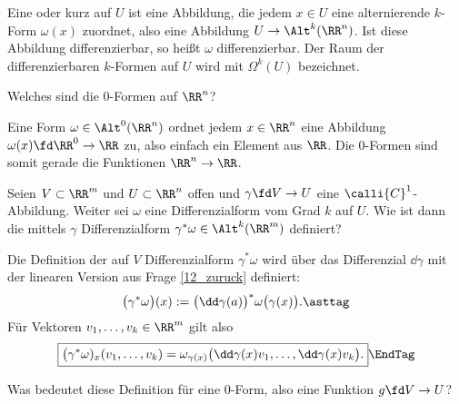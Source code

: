 \begin{antwort}
  Eine  oder 
  kurz  auf $U$ ist eine Abbildung, die jedem 
  $x\in U$ eine alternierende $k$-Form $\omega(x)$ zuordnet, also 
  eine Abbildung $U \to \Alt^k(\RR^n)$. Ist diese 
  Abbildung differenzierbar, so heißt $\omega$ differenzierbar. Der 
  Raum der differenzierbaren $k$-Formen auf $U$ wird mit 
  $\Omega^k (U)$ bezeichnet.
  \AntEnd
\end{antwort} 

\begin{frage}
  Welches sind die $0$-Formen auf $\RR^n$?
\end{frage}

\begin{antwort}
  Eine Form $\omega\in\Alt^0(\RR^n)$ ordnet jedem $x\in\RR^n$ eine 
  Abbildung $\omega(x) \fd \RR^0 \to \RR$ zu, also einfach ein Element 
  aus $\RR$. Die $0$-Formen sind 
  somit gerade die Funktionen $\RR^n\to\RR$. \AntEnd 
\end{antwort} 

\begin{frage}\label{zuruck}
  Seien $V\subset\RR^m$ und $U\subset\RR^n$ offen und $\gamma \fd V \to U$ 
  eine $\calli{C}^1$-Abbildung. Weiter sei $\omega$ eine Differenzialform 
  vom Grad $k$ auf $U$. Wie ist dann die 
  mittels $\gamma$  Differenzialform 
  $\gamma^*\omega \in \Alt^k(\RR^m)$ definiert?
\end{frage}

\begin{antwort}
  Die Definition der auf $V$  
  Differenzialform $\gamma^*\omega$ wird über das Differenzial 
  $\dd \gamma$ mit der linearen Version aus Frage \ref{12_zuruck} 
  definiert: 
  \[
  \big(\gamma^*\omega \big)(x):=  
  \big( \dd \gamma (a) \big)^* \omega\big( \gamma(x) \big).{\asttag}
  \]
  Für Vektoren $v_1,\ldots,v_k \in \RR^m$ gilt also 
  \[
  \boxed{\big( \gamma^* \omega )_x (v_1,\ldots,v_k)=
    \omega_{\gamma(x)} \big( \dd\gamma (x) v_1, \ldots, \dd\gamma (x) v_k \big).}
  \EndTag
  \]
\end{antwort} 


\begin{frage}
  Was bedeutet diese Definition für eine $0$-Form, 
  also eine Funktion $g\fd V\to U$?
\end{frage} 

